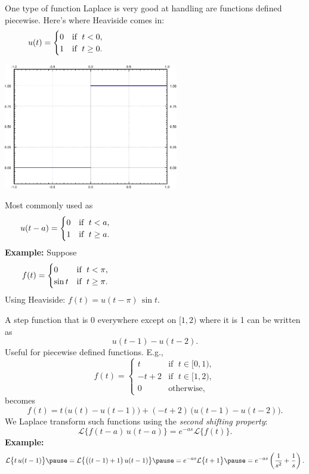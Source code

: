 \documentclass[10pt,aspectratio=169]{beamer}
\begin{document}
\begin{frame}
One type of function Laplace is very good at handling are functions defined
piecewise.  Here's where Heaviside comes in:
\[
u(t) =
\begin{cases}
0 & \text{if } \; t < 0 , \\ 
1 & \text{if } \; t \geq 0 .
\end{cases}
\hspace*{3in}
\]
\vspace*{-0.69in}

\hfill
\includegraphics[width=3.0in]{../figures/lt-heaviside}

\pause
\vspace*{-1.50in}

Most commonly used as
\[
u(t-a) =
\begin{cases}
0 & \text{if } \; t < a , \\ 
1 & \text{if } \; t \geq a .
\end{cases}
\hspace*{3in}
\]
\pause
\textbf{Example:}
Suppose
\begin{equation*}
f(t) =
\begin{cases}
0 & \text{if } \; t < \pi , \\ 
\sin t & \text{if } \; t \geq \pi .
\end{cases}
\hspace*{3in}
\end{equation*}
\pause
Using Heaviside: \quad $f(t) = u(t - \pi) \, \sin t$.
\end{frame}

\begin{frame}
A step function that is $0$ everywhere except on $[1,2)$ where it is 1
can be written as
\[
u(t - 1) - u(t-2) .
\]
\pause
Useful for piecewise defined functions.  E.g.,
\[
f(t) =
\begin{cases}
t & \text{if } \; t \in [0,1) , \\ 
-t+2 & \text{if } \; t \in [1,2), \\
0 & \text{otherwise} ,
\end{cases}
\]
becomes
\[
f(t) = t \, \bigl( u(t) - u(t-1) \bigr) + 
(-t+2) \, \bigl( u(t - 1) - u(t-2) \bigr) .
\]
\pause
We Laplace transform such functions using the \emph{second shifting property}:
\[
\mathcal{L} \bigl\{ f(t-a) \, u(t-a) \bigr\}
= e^{-as} \mathcal{L} \bigl\{ f(t) \bigr\} .
\]
\pause
\textbf{Example:}
\[
\mathcal{L} \bigl\{ t \, u(t-1) \bigr\}
\pause
=
\mathcal{L} \bigl\{ \bigl( (t-1) + 1\bigr) \, u(t-1) \bigr\}
\pause
= e^{-as} \mathcal{L} \bigl\{ t+1 \bigr\}
\pause
= e^{-as} \left(\frac{1}{s^2} + \frac{1}{s} \right)
.
\]
\end{frame}
\end{document}
